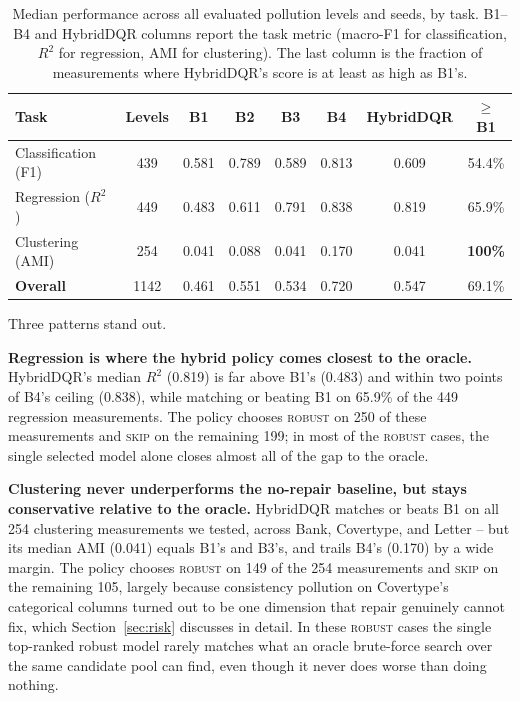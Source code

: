 \documentclass[runningheads]{llncs}
\begin{document}
\begin{table}[t]
\centering
\caption{Median performance across all evaluated pollution levels
and seeds, by task. B1--B4 and HybridDQR columns report the task
metric (macro-F1 for classification, $R^2$ for regression, AMI for
clustering). The last column is the fraction of measurements where
HybridDQR's score is at least as high as B1's.}
\label{tab:results}
\small
\setlength{\tabcolsep}{4pt}
\begin{tabular}{@{}lccccccc@{}}
\toprule
\textbf{Task} & \textbf{Levels} & \textbf{B1} & \textbf{B2} & \textbf{B3} & \textbf{B4} & \textbf{HybridDQR} & \textbf{$\geq$B1}\\
\midrule
Classification (F1)   & 439 & 0.581 & 0.789 & 0.589 & 0.813 & 0.609 & 54.4\% \\
Regression ($R^2$)    & 449 & 0.483 & 0.611 & 0.791 & 0.838 & 0.819 & 65.9\% \\
Clustering (AMI)      & 254 & 0.041 & 0.088 & 0.041 & 0.170 & 0.041 & \textbf{100\%} \\
\midrule
\textbf{Overall}      & 1142 & 0.461 & 0.551 & 0.534 & 0.720 & 0.547 & 69.1\% \\
\bottomrule
\end{tabular}
\end{table}

Three patterns stand out.

\textbf{Regression is where the hybrid policy comes closest to
the oracle.} HybridDQR's median $R^2$ (0.819) is far above B1's
(0.483) and within two points of B4's ceiling (0.838), while
matching or beating B1 on 65.9\% of the 449 regression
measurements. The policy chooses \textsc{robust} on 250 of these
measurements and \textsc{skip} on the remaining 199; in most of
the \textsc{robust} cases, the single selected model alone closes
almost all of the gap to the oracle.

\textbf{Clustering never underperforms the no-repair baseline, but
stays conservative relative to the oracle.} HybridDQR matches or
beats B1 on all 254 clustering measurements we tested, across
Bank, Covertype, and Letter -- but its median AMI (0.041) equals
B1's and B3's, and trails B4's (0.170) by a wide margin. The policy
chooses \textsc{robust} on 149 of the 254 measurements and
\textsc{skip} on the remaining 105, largely because consistency
pollution on Covertype's categorical columns turned out to be one
dimension that repair genuinely cannot fix, which
Section~\ref{sec:risk} discusses in detail. In these
\textsc{robust} cases the single top-ranked robust model rarely
matches what an oracle brute-force search over the same candidate
pool can find, even though it never does worse than doing nothing.
\end{document}
